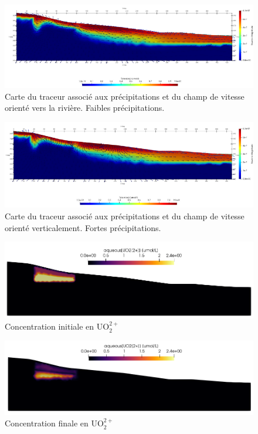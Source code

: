 \documentclass{article}
\begin{document}
\begin{figure}[H]
    \centering
    \includegraphics[width=0.9\linewidth]{III_B_3_6.png}
    
    \caption{Carte du traceur associé aux précipitations et du champ de vitesse orienté vers la rivière. Faibles précipitations.}
    \label{fig:v_précipitations_ribiere_1}
\end{figure}
\label{page:evolution_champ_vitesse}
\begin{figure}[H]
    \centering
    \includegraphics[width=0.9\linewidth]{III_B_3_7.png}
    
    \caption{Carte du traceur associé aux précipitations et du champ de vitesse orienté verticalement. Fortes précipitations.}
    \label{fig:v_précipitations_ribiere_2}
\end{figure}

\begin{figure}[H]
    \centering
    \includegraphics[width=\linewidth]{LJ-UO22P-initial.png}
    \caption{Concentration initiale en UO$_2^{2+}$}
    \label{fig:uo2P-initial}
\end{figure}
\begin{figure}[H]
    \centering
    \includegraphics[width=\linewidth]{LJ-UO22P-final.PNG}
    \caption{Concentration finale en UO$_2^{2+}$}
    \label{fig:uo2P-final}
\end{figure}
\end{document}

